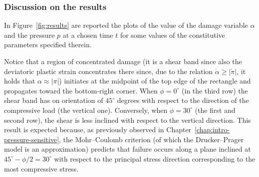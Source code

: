 \documentclass[a4paper,10pt,twoside]{amsbook}
\numberwithin{section}{chapter}
\numberwithin{equation}{chapter}
\theoremstyle{definition}
\begin{document}
\subsubsection*{Discussion on the results}

In Figure~\ref{fig:results} are reported the plots of the value of the damage variable $\alpha$ and the pressure $p$ at a chosen time $t$ for some values of the constitutive parameters specified therein.

Notice that a region of concentrated damage (it is a shear band since also the deviatoric plastic strain concentrates there since, due to the relation $\dot\alpha\ge|\dot\pi|$, it holds that $\alpha\approx|\pi|$) initiates at the midpoint of the top edge of the rectangle and propagates toward the bottom-right corner. When $\phi=0^\circ$ (in the third row) the shear band has on orientation of $45^\circ$ degrees with respect to the direction of the compressive load (the vertical one). Conversely, when $\phi=30^\circ$ (the first and second row), the shear is less inclined with respect to the vertical direction. This result is expected because, as previously observed in Chapter~\ref{chap:intro-pressure-sensitive}, the Mohr–Coulomb criterion (of which the Drucker–Prager model is an approximation) predicts that failure occurs along a plane inclined at $45^\circ-\phi/2=30^\circ$ with respect to the principal stress direction corresponding to the most compressive stress.
\end{document}
